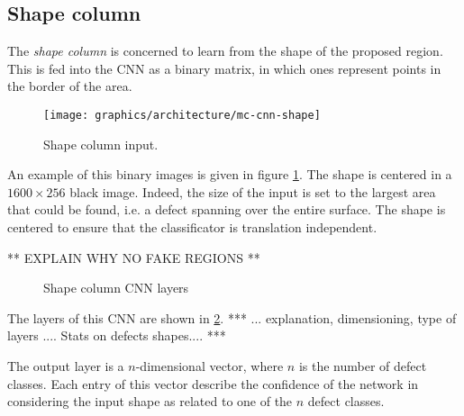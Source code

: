     \subsection{Shape column}\label{section:shape-column}
        \par{
            The \emph{shape column} is concerned to learn from the shape of the proposed region. This is fed into the CNN as a binary matrix, in which ones represent points in the border of the area.
        }
        \begin{figure}
            \centering
            \texttt{[image: graphics/architecture/mc-cnn-shape]}
            \caption{Shape column input.}\label{fig:mc-cnn:shape-input}
        \end{figure}
        \par{
            An example of this binary images is given in figure \ref{fig:mc-cnn:shape-input}. The shape is centered in a $1600\times 256$ black image. Indeed, the size of the input is set to the largest area that could be found, i.e. a defect spanning over the entire surface. The shape is centered to ensure that the classificator is translation independent. 
        }
        \par{
            ** EXPLAIN WHY NO FAKE REGIONS **
        }
        \begin{figure}
            \centering
            \caption{Shape column CNN layers}\label{fig:mc-cnn:shape-structure}
        \end{figure}
        \par{
            The layers of this CNN are shown in \ref{fig:mc-cnn:shape-structure}. *** ... explanation, dimensioning, type of layers .... Stats on defects shapes.... ***
        }
        \par{
            The output layer is a $n$-dimensional vector, where $n$ is the number of defect classes. Each entry of this vector describe the confidence of the network in considering the input shape as related to one of the $n$ defect classes.
        }
